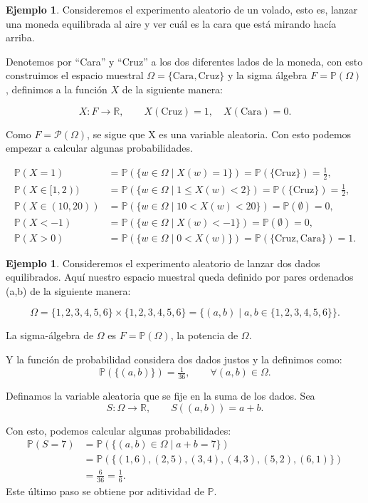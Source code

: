 \documentclass[
 12pt,
 letterpaper,
]{article}
\theoremstyle{teoremaBreak}
\theoremstyle{plain}
\theoremstyle{definition}
\newtheorem{ejemplo}[teorema]{Ejemplo}
\begin{document}
\begin{ejemplo}

Consideremos el experimento aleatorio de un volado, esto es, lanzar una
moneda equilibrada al aire y ver cuál es la cara que está mirando hacía
arriba.

Denotemos por ``Cara'' y ``Cruz'' a los dos diferentes lados de la
moneda, con esto construimos el espacio muestral $\Omega = \{\text{Cara},
\text{Cruz}\}$ y la sigma álgebra $F = \mathbb{P}(\Omega)$, definimos a la función $X$ de la
siguiente manera:

\[
X:F \to \mathbb{R}, \qquad X(\text{Cruz}) = 1, \quad X(\text{Cara}) = 0.
\]

Como $F = \mathcal{P}(\Omega)$, se sigue que X es una variable
aleatoria. Con esto podemos empezar a calcular algunas probabilidades.

\begin{align*}
\mathbb{P}(X = 1)
&= \mathbb{P}(\{w \in \Omega \mid X(w) = 1\})
= \mathbb{P}(\{\text{Cruz}\})
= \tfrac{1}{2}, \\
\mathbb{P}(X \in [1,2))
&= \mathbb{P}(\{w \in \Omega \mid 1 \le X(w) < 2\})
= \mathbb{P}(\{\text{Cruz}\})
= \tfrac{1}{2}, \\
\mathbb{P}(X \in (10,20))
&= \mathbb{P}(\{w \in \Omega \mid 10 < X(w) < 20\})
= \mathbb{P}(\emptyset)
= 0, \\
\mathbb{P}(X < -1)
&= \mathbb{P}(\{w \in \Omega \mid X(w) < -1\})
= \mathbb{P}(\emptyset)
= 0, \\
\mathbb{P}(X > 0)
&= \mathbb{P}(\{w \in \Omega \mid 0 < X(w)\})
= \mathbb{P}(\{\text{Cruz},\text{Cara}\})
= 1.
\end{align*}
\end{ejemplo}

\begin{ejemplo}

Consideremos el experimento aleatorio de lanzar dos dados equilibrados.
Aquí nuestro espacio muestral queda definido por pares ordenados (a,b)
de la siguiente manera:

\[
\Omega = \{1,2,3,4,5,6\} \times \{1,2,3,4,5,6\}
= \{(a,b) \mid a,b \in \{1,2,3,4,5,6\}\}.
\]

La sigma-álgebra de $\Omega$ es $F = \mathbb{P}(\Omega)$, la potencia de $\Omega$.

Y la función de probabilidad considera dos dados justos y la definimos
como:
\[
\mathbb{P}(\{(a,b)\}) = \tfrac{1}{36}, \qquad \forall (a,b) \in \Omega.
\]

Definamos la variable aleatoria que se fije en la suma de los dados. Sea
\[
S: \Omega \to \mathbb{R}, \qquad S((a,b)) = a+b.
\]

Con esto, podemos calcular algunas probabilidades:
\begin{align*}
\mathbb{P}(S = 7)
&= \mathbb{P}(\{(a,b) \in \Omega \mid a+b=7\}) \\
&= \mathbb{P}(\{(1,6),(2,5),(3,4),(4,3),(5,2),(6,1)\}) \\
&= \tfrac{6}{36} = \tfrac{1}{6}.
\end{align*}
Este último paso se obtiene por aditividad de $\mathbb{P}$.
\end{ejemplo}
\end{document}
